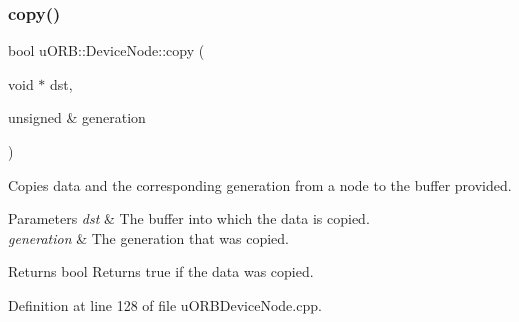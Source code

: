 \subsubsection{\texorpdfstring{copy()}{copy()}}
{\footnotesize\ttfamily bool u\+O\+R\+B\+::\+Device\+Node\+::copy (\begin{DoxyParamCaption}\item[{void $\ast$}]{dst,  }\item[{unsigned \&}]{generation }\end{DoxyParamCaption})}

Copies data and the corresponding generation from a node to the buffer provided.


\begin{DoxyParams}{Parameters}
{\em dst} & The buffer into which the data is copied. \\
\hline
{\em generation} & The generation that was copied. \\
\hline
\end{DoxyParams}
\begin{DoxyReturn}{Returns}
bool Returns true if the data was copied. 
\end{DoxyReturn}


Definition at line 128 of file u\+O\+R\+B\+Device\+Node.\+cpp.


